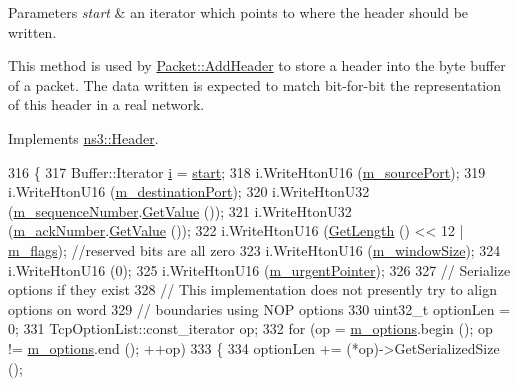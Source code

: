 \begin{DoxyParams}{Parameters}
{\em start} & an iterator which points to where the header should be written.\\
\hline
\end{DoxyParams}
This method is used by \hyperlink{classns3_1_1Packet_a465108c595a0bc592095cbcab1832ed8}{Packet\+::\+Add\+Header} to store a header into the byte buffer of a packet. The data written is expected to match bit-\/for-\/bit the representation of this header in a real network. 

Implements \hyperlink{classns3_1_1Header_afb61f1aac69ff8349a6bfe521fab5404}{ns3\+::\+Header}.


\begin{DoxyCode}
316 \{
317   Buffer::Iterator \hyperlink{bernuolliDistribution_8m_a6f6ccfcf58b31cb6412107d9d5281426}{i} = \hyperlink{namespacevisualizer_1_1core_a2a35e5d8a34af358b508dac8635754e0}{start};
318   i.WriteHtonU16 (\hyperlink{classns3_1_1TcpHeader_a44bcf51982e1c0bd0c8fd205a28c3927}{m\_sourcePort});
319   i.WriteHtonU16 (\hyperlink{classns3_1_1TcpHeader_aef80cfee978806b00bf64f8154bea90f}{m\_destinationPort});
320   i.WriteHtonU32 (\hyperlink{classns3_1_1TcpHeader_aa160a3f86f17511b39b2ec5b95485a9d}{m\_sequenceNumber}.\hyperlink{classns3_1_1SequenceNumber_ad1dc215eb95f5371596af8ec914d3e72}{GetValue} ());
321   i.WriteHtonU32 (\hyperlink{classns3_1_1TcpHeader_acee437093aa7817e583ad5f62afc9cca}{m\_ackNumber}.\hyperlink{classns3_1_1SequenceNumber_ad1dc215eb95f5371596af8ec914d3e72}{GetValue} ());
322   i.WriteHtonU16 (\hyperlink{classns3_1_1TcpHeader_a957928d2dd1108dc1ef8c38daecdcf62}{GetLength} () << 12 | \hyperlink{classns3_1_1TcpHeader_adf2f1e35446aca125ff4a66527d7974c}{m\_flags}); \textcolor{comment}{//reserved bits are all zero}
323   i.WriteHtonU16 (\hyperlink{classns3_1_1TcpHeader_abbf7aca8f5e3e796525b4b423b4dbf39}{m\_windowSize});
324   i.WriteHtonU16 (0);
325   i.WriteHtonU16 (\hyperlink{classns3_1_1TcpHeader_a06c558a3586f9756e6a18165dee3399d}{m\_urgentPointer});
326 
327   \textcolor{comment}{// Serialize options if they exist}
328   \textcolor{comment}{// This implementation does not presently try to align options on word}
329   \textcolor{comment}{// boundaries using NOP options}
330   uint32\_t optionLen = 0;
331   TcpOptionList::const\_iterator op;
332   \textcolor{keywordflow}{for} (op = \hyperlink{classns3_1_1TcpHeader_af0a6b523e1769d521e2a90caa1c8b4d2}{m\_options}.begin (); op != \hyperlink{classns3_1_1TcpHeader_af0a6b523e1769d521e2a90caa1c8b4d2}{m\_options}.end (); ++op)
333     \{
334       optionLen += (*op)->GetSerializedSize ();

\end{DoxyCode}
